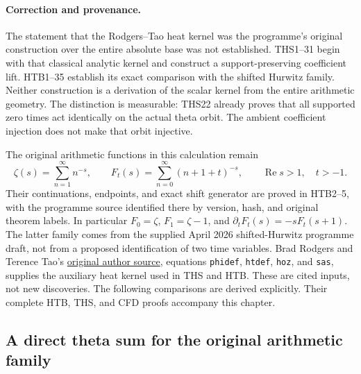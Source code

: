 \documentclass[11pt]{article}
\begin{document}
\paragraph{Correction and provenance.}
The statement that the Rodgers--Tao heat kernel was the programme's
original construction over the entire absolute base was not established.
THS1--31 begin with that classical analytic kernel and construct a
support-preserving coefficient lift. HTB1--35 establish its exact
comparison with the shifted Hurwitz family. Neither construction is a
derivation of the scalar kernel from the entire arithmetic geometry.
The distinction is measurable: THS22 already proves that all supported
zero times act identically on the actual theta orbit. The ambient
coefficient injection does not make that orbit injective.

The original arithmetic functions in this calculation remain
\begin{equation}\tag{ZTC1}
 \zeta(s)=\sum_{n=1}^{\infty}n^{-s},\qquad
 F_t(s)=\sum_{n=0}^{\infty}(n+1+t)^{-s},
 \qquad \operatorname{Re}s>1,\quad t>-1.
\end{equation}
Their continuations, endpoints, and exact shift generator are proved in
HTB2--5, with the programme source identified there by version, hash,
and original theorem labels. In particular $F_0=\zeta$,
$F_1=\zeta-1$, and $\partial_tF_t(s)=-sF_t(s+1)$.
The latter family comes from the supplied April 2026 shifted-Hurwitz
programme draft, not from a proposed identification of two time variables.
Brad Rodgers and Terence Tao's
\href{https://arxiv.org/abs/1801.05914v5}{original author source},
equations \texttt{phidef}, \texttt{htdef}, \texttt{hoz}, and
\texttt{sas}, supplies the auxiliary heat kernel used in THS and HTB.
These are cited inputs, not new discoveries. The following comparisons
are derived explicitly. Their complete HTB, THS, and CFD proofs accompany
this chapter.

\subsection{A direct theta sum for the original arithmetic family}
\end{document}
